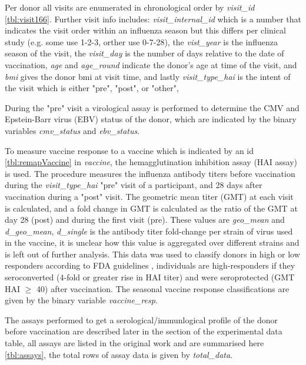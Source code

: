 Per donor all visits are enumerated in chronological order by
\textit{visit\_id} \autoref{tbl:visit166}. Further visit info includes:
\textit{visit\_internal\_id} which is a number that indicates the visit order
within an influenza season but this differs per clinical study (e.g. some use
1-2-3, orther use 0-7-28), the \textit{vist\_year} is the influenza season of
the visit, the \textit{visit\_day} is the number of days relative to the date
of vaccination,  \textit{age} and \textit{age\_round} indicate the donor's age
at time of the visit, and \textit{bmi} gives the donor bmi at visit time, and
lastly \textit{visit\_type\_hai} is the intent of the visit which is either
"pre", "post", or "other",

During the "pre" visit a virological assay is performed to determine the CMV
and Epstein-Barr virus (EBV) status of the donor, which are indicated by the
binary variables \textit{cmv\_status} and \textit{ebv\_status}.

To measure vaccine response to a vaccine which is indicated by an id
\autoref{tbl:remapVaccine} in \textit{vaccine}, the hemagglutination inhibition
assay (HAI assay) is used. The procedure measures the influenza antibody titers
before vaccination during the \textit{visit\_type\_hai} "pre" visit of a
participant, and 28 days after vaccination during a "post" visit. The geometric
mean titer (GMT) at each visit is calculated, and a fold change in GMT is
calculated as the ratio of the GMT at day 28 (post) and during the first visit
(pre). These values are \textit{geo\_mean} and \textit{d\_geo\_mean},
\textit{d\_single} is the antibody titer fold-change per strain of virus used
in the vaccine, it is unclear how this value is aggregated over different
strains and is left out of further analysis.  This data was used to classify
donors in high or low responders according to FDA guidelines \cite{},
individuals are high-responders if they seroconverted (4-fold or greater rise
in HAI titer) and were seroprotected (GMT HAI \(\ge\) 40) after vaccination.
The seasonal vaccine response classifications are given by the binary variable
\textit{vaccine\_resp}.

The assays performed to get a serological/immunlogical profile of the donor
before vaccination are described later in the section of the experimental data
table, all assays are listed in the original work
\cite{tomicFluPRINTDatasetMultidimensional2019} and are summarised here
\autoref{tbl:assays}, the total rows of assay data is given by
\textit{total\_data}.

